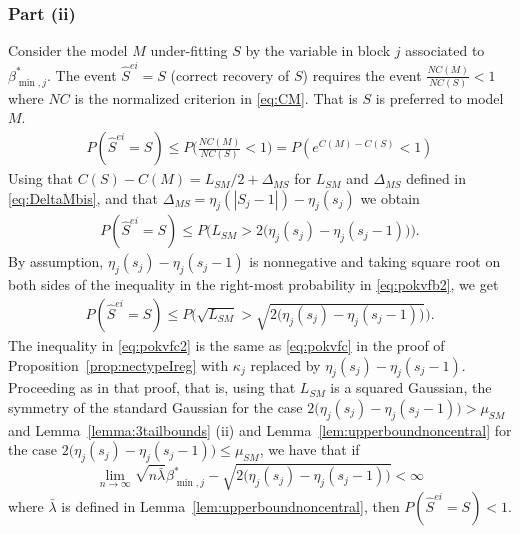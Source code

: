 \documentclass[
  12pt]{article}
\begin{document}
\subsubsection{Part (ii)}
Consider the model $M$ under-fitting $S$ by the variable in block $j$ associated to $\beta_{\min,j}^*$. The event $\hat{S}^{ei}=S$ (correct recovery of $S$) requires the event $\frac{NC(M)}{NC(S)}<1$ where $NC$ is the normalized criterion in \eqref{eq:CM}. That is $S$ is preferred to model $M$. 
\begin{align*}
P(\hat{S}^{ei}=S) 
\leq P\Big(\frac{NC(M)}{NC(S)}<1\Big)
= P \left( e^{C(M)-C(S)} <1 \right)
\end{align*}
Using that $C(S)-C(M)=L_{SM}/2 + \Delta_{MS}$ for $L_{SM}$ and $\Delta_{MS}$ defined in \eqref{eq:DeltaMbis}, and that $\Delta_{MS}=\eta_j(|S_j-1|)-\eta_j(s_j)$ we obtain
\begin{align}\label{eq:pokvfb2}
P(\hat{S}^{ei}=S) 
\leq
P\Big(L_{SM}>2\big(\eta_j(s_j)-\eta_j(s_j-1)\big)\Big).
\end{align}
By assumption, $\eta_j(s_j)-\eta_j(s_j-1)$ is nonnegative and taking square root on both sides of the inequality in the right-most probability in \eqref{eq:pokvfb2}, we get
\begin{align}\label{eq:pokvfc2}
P(\hat{S}^{ei}=S) 
\leq P\Big(\sqrt{L_{SM}}>\sqrt{2\big(\eta_j(s_j)-\eta_j(s_j-1)\big)}\Big).
\end{align}
The inequality in \eqref{eq:pokvfc2} is the same as \eqref{eq:pokvfc} in the proof of Proposition~\ref{prop:nectypeIreg} with $\kappa_j$ replaced by $\eta_j(s_j)-\eta_j(s_j-1)$. Proceeding as in that proof, that is, using that $L_{SM}$ is a squared Gaussian, the symmetry of the standard Gaussian for the case $2\big(\eta_j(s_j)-\eta_j(s_j-1)\big)>\mu_{SM}$ and Lemma~\ref{lemma:3tailbounds} (ii) and Lemma~\ref{lem:upperboundnoncentral} for the case $2\big(\eta_j(s_j)-\eta_j(s_j-1)\big)\leq \mu_{SM}$, we have that if $$\lim_{n\to \infty}\sqrt{n\bar{\lambda}}\beta_{\min,j}^*-\sqrt{2\big(\eta_j(s_j)-\eta_j(s_j-1)\big)} < \infty$$ where $\bar{\lambda}$ is defined in Lemma~\ref{lem:upperboundnoncentral}, then $P(\hat{S}^{ei}=S)<1$.
\end{document}
